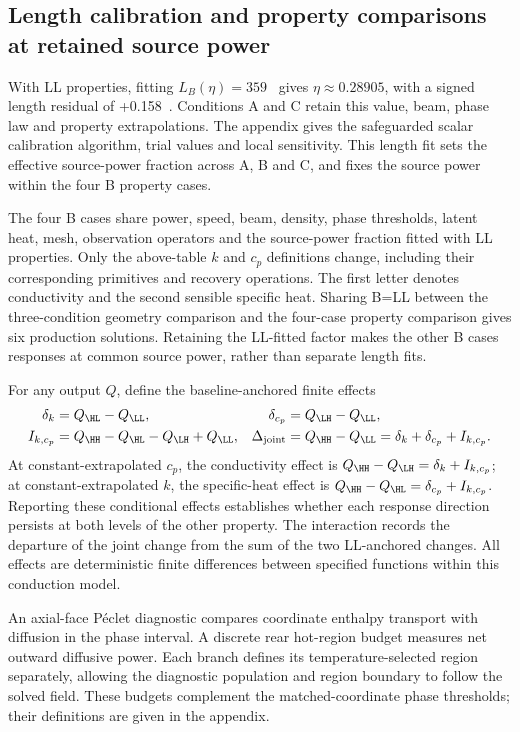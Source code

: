 \subsection{Length calibration and property comparisons at retained source power}
With LL properties, fitting $L_B(\eta)=359$~\um{} gives $\eta\approx0.28905$, with a signed length residual of +0.158~\um. Conditions A and C retain this value, beam, phase law and property extrapolations. The appendix gives the safeguarded scalar calibration algorithm, trial values and local sensitivity. This length fit sets the effective source-power fraction across A, B and C, and fixes the source power within the four B property cases.

The four B cases share power, speed, beam, density, phase thresholds, latent heat, mesh, observation operators and the source-power fraction fitted with LL properties. Only the above-table $k$ and $c_p$ definitions change, including their corresponding primitives and recovery operations. The first letter denotes conductivity and the second sensible specific heat. Sharing B=LL between the three-condition geometry comparison and the four-case property comparison gives six production solutions. Retaining the LL-fitted factor makes the other B cases responses at common source power, rather than separate length fits.

For any output $Q$, define the baseline-anchored finite effects
\begin{align}
 \delta_k&=Q_{\HL}-Q_{\LL}, &
 \delta_{c_p}&=Q_{\LH}-Q_{\LL},\\
 I_{k,c_p}&=Q_{\HH}-Q_{\HL}-Q_{\LH}+Q_{\LL}, &
 \Delta_{\rm joint}&=Q_{\HH}-Q_{\LL}=\delta_k+\delta_{c_p}+I_{k,c_p}.
 \label{eq:contrast}
\end{align}
At constant-extrapolated $c_p$, the conductivity effect is $Q_{\HH}-Q_{\LH}=\delta_k+I_{k,c_p}$; at constant-extrapolated $k$, the specific-heat effect is $Q_{\HH}-Q_{\HL}=\delta_{c_p}+I_{k,c_p}$. Reporting these conditional effects establishes whether each response direction persists at both levels of the other property. The interaction records the departure of the joint change from the sum of the two LL-anchored changes. All effects are deterministic finite differences between specified functions within this conduction model.

An axial-face P\'eclet diagnostic compares coordinate enthalpy transport with diffusion in the phase interval. A discrete rear hot-region budget measures net outward diffusive power. Each branch defines its temperature-selected region separately, allowing the diagnostic population and region boundary to follow the solved field. These budgets complement the matched-coordinate phase thresholds; their definitions are given in the appendix.

